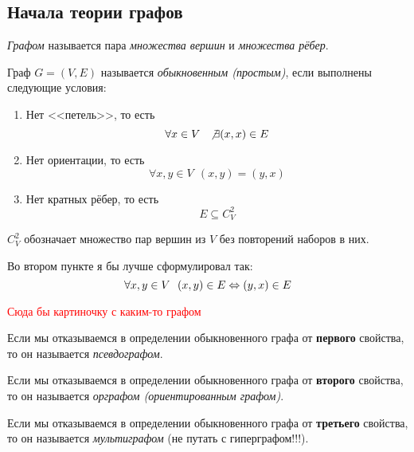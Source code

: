 \subsection{Начала теории графов}

\begin{definition}
	\textit{Графом} называется пара \textit{множества вершин} и \textit{множества рёбер}.
\end{definition}

\begin{definition}
	Граф $G = (V, E)$ называется \textit{обыкновенным (простым)}, если выполнены следующие условия:
	\begin{enumerate}
		\item Нет <<петель>>, то есть
		\[
			\forall x \in V\ \ \not\exists (x, x) \in E
		\]
		
		\item Нет ориентации, то есть
		\[
			\forall x, y \in V\ \ (x, y) = (y, x)
		\]
		
		\item Нет кратных рёбер, то есть
		\[
			E \subseteq C_V^2
		\]
	\end{enumerate}
\end{definition}

\begin{note}
	$C_V^2$ обозначает множество пар вершин из $V$ без повторений наборов в них.
\end{note}

\begin{anote}
	Во втором пункте я бы лучше сформулировал так:
	\[
		\forall x, y \in V\ \ (x, y) \in E \Leftrightarrow (y, x) \in E
	\]
\end{anote}

\textcolor{red}{Сюда бы картиночку с каким-то графом}

\begin{definition}
	Если мы отказываемся в определении обыкновенного графа от \textbf{первого} свойства, то он называется \textit{псевдографом}.
\end{definition}

\begin{definition}
	Если мы отказываемся в определении обыкновенного графа от \textbf{второго} свойства, то он называется \textit{орграфом (ориентированным графом)}.
\end{definition}

\begin{definition}
	Если мы отказываемся в определении обыкновенного графа от \textbf{третьего} свойства, то он называется \textit{мультиграфом} (не путать с гиперграфом!!!).
\end{definition}

